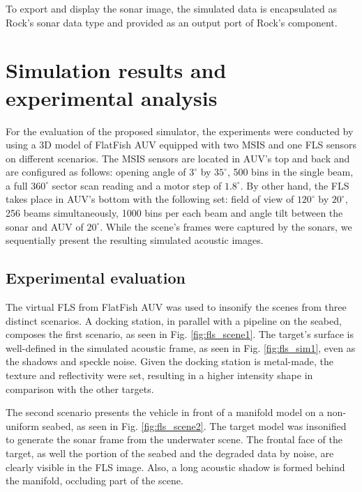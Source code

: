 \documentclass[final,5p,times]{elsarticle}
\begin{document}
To export and display the sonar image, the simulated data is encapsulated as Rock's sonar data type and provided as an output port of Rock's component.


\section{Simulation results and experimental analysis}
\label{results}

For the evaluation of the proposed simulator, the experiments were conducted by using a 3D model of FlatFish AUV equipped with two MSIS and one FLS sensors on different scenarios. The MSIS sensors are located in AUV's top and back and are configured as follows: opening angle of $3^{\circ}$ by $35^{\circ}$, 500 bins in the single beam, a full $360^{\circ}$ sector scan reading and a motor step of $1.8^{\circ}$. By other hand, the FLS takes place in AUV's bottom with the following set: field of view of $120^{\circ}$ by $20^{\circ}$, 256 beams simultaneously, 1000 bins per each beam and angle tilt between the sonar and AUV of $20^{\circ}$. While the scene's frames were captured by the sonars, we sequentially present the resulting simulated acoustic images.

\subsection{Experimental evaluation}

The virtual FLS from FlatFish AUV was used to insonify the scenes from three distinct scenarios. A docking station, in parallel with a pipeline on the seabed, composes the first scenario, as seen in Fig. \ref{fig:fls_scene1}. The target's surface is well-defined in the simulated acoustic frame, as seen in Fig. \ref{fig:fls_sim1}, even as the shadows and speckle noise. Given the docking station is metal-made, the texture and reflectivity were set, resulting in a higher intensity shape in comparison with the other targets.

The second scenario presents the vehicle in front of a manifold model on a non-uniform seabed, as seen in Fig. \ref{fig:fls_scene2}. The target model was insonified to generate the sonar frame from the underwater scene. The frontal face of the target, as well the portion of the seabed and the degraded data by noise, are clearly visible in the FLS image. Also, a long acoustic shadow is formed behind the manifold, occluding part of the scene.
\end{document}
